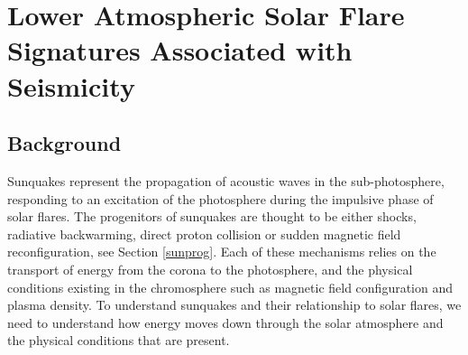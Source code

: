\section{Lower Atmospheric Solar Flare Signatures Associated with Seismicity}




\subsection{Background} 
Sunquakes represent the propagation of acoustic waves in the sub-photosphere, responding to an excitation of the photosphere during the impulsive phase of solar flares. The progenitors of sunquakes are thought to be either shocks, radiative backwarming, direct proton collision or sudden magnetic field reconfiguration, see Section \ref{sunprog}. Each of these mechanisms relies on the transport of energy from the corona to the photosphere, and the physical conditions existing in the chromosphere such as magnetic field configuration and plasma density. To understand sunquakes and their relationship to solar flares, we need to understand how energy moves down through the solar atmosphere and the physical conditions that are present. \\

